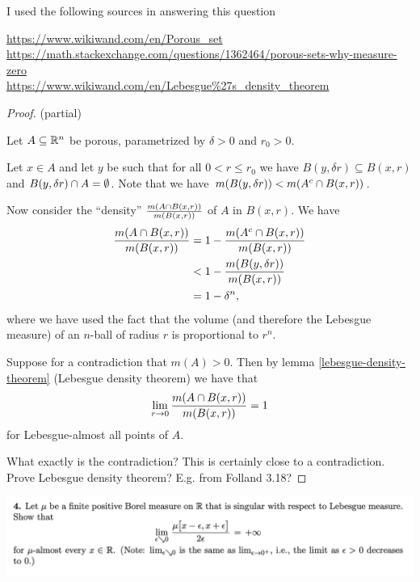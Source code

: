 I used the following sources in answering this question

\url{https://www.wikiwand.com/en/Porous_set}\\
\url{https://math.stackexchange.com/questions/1362464/porous-sets-why-measure-zero}\\
\url{https://www.wikiwand.com/en/Lebesgue%27s_density_theorem}\\

\begin{proof}
   (partial)

  Let $A \subseteq \mathbb{R}^n$ be porous, parametrized by $\delta > 0$ and $r_0 > 0$.

  Let $x \in A$ and let $y$ be such that for all $0 < r \leq r_0$ we have $B(y, \delta r) \subseteq B(x, r)$
  and $B(y, \delta r) \cap A = \emptyset$. Note that we have $m(B(y, \delta r)) < m(A^c \cap B(x, r))$.

  Now consider the ``density​'' $\frac{m(A \cap B(x, r))}{m(B(x, r))}$ of $A$ in $B(x, r)$. We have
  \begin{align*}
    \frac{m(A \cap B(x, r))}{m(B(x, r))}
    &= 1 - \frac{m(A^c \cap B(x, r))}{m(B(x, r))} \\
    &< 1 - \frac{m(B(y, \delta r))}{m(B(x, r))} \\
    &= 1 - \delta^n,
  \end{align*}
  where we have used the fact that the volume (and therefore the Lebesgue measure) of an $n$-ball of radius $r$
  is proportional to $r^n$.

  Suppose for a contradiction that $m(A) > 0$. Then by lemma \ref{lebesgue-density-theorem} (Lebesgue density
  theorem) we have that
  \begin{align*}
    \lim_{r \to 0} \frac{m(A \isect B(x, r))}{m(B(x, r))} = 1
  \end{align*}
  for Lebesgue-almost all points of $A$.

   What exactly is the contradiction? This is certainly close to a contradiction.
   Prove Lebesgue density theorem? E.g. from Folland 3.18?

\end{proof}



\newpage
\begin{mdframed}
\includegraphics[width=400pt]{img/analysis--berkeley-202a-final-21a6.png}
\end{mdframed}

